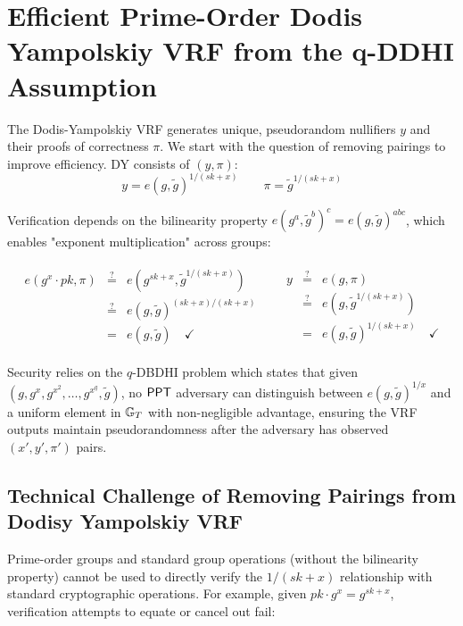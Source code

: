 \section{Efficient Prime-Order Dodis Yampolskiy VRF from the q-DDHI Assumption}\label{sec:vrf-prime-order}

The Dodis-Yampolskiy \cite{hutchison_verifiable_2005} VRF generates unique, pseudorandom nullifiers $y$ and their proofs of correctness $\pi$. We start with the question of removing pairings to improve efficiency. DY consists of $(y, \pi)$:
\[
y = e(g, \tilde{g})^{1/(sk+x)} \qquad \pi = \tilde{g}^{1/(sk+x)}
\]

Verification depends on the bilinearity property $e(g^a, \tilde{g}^b)^c = e(g, \tilde{g})^{abc}$, which enables "exponent multiplication" across groups:

\begin{align*}
    \begin{array}{rcl}
    e(g^x \cdot pk, \pi) & \stackrel{?}{=} & e(g^{sk+x}, \tilde{g}^{1/(sk+x)}) \\
     & \stackrel{?}{=} & e(g, \tilde{g})^{(sk+x)/(sk+x)} \\
     & = & e(g, \tilde{g}) \quad \checkmark
    \end{array}
    &&
    \begin{array}{rcl}
    y & \stackrel{?}{=} & e(g, \pi) \\
     & \stackrel{?}{=} & e(g,\tilde{g}^{1/(sk+x)}) \\
     & = & e(g, \tilde{g})^{1/(sk+x)} \quad \checkmark
    \end{array}
\end{align*}

Security relies on the $q$-DBDHI problem which states that given $(g, g^x, g^{x^2}, \ldots, g^{x^q}, \tilde{g})$, no $\mathsf{PPT}$ adversary can distinguish between $e(g,\tilde{g})^{1/x}$ and a uniform element in $\mathbb{G}_T$ with non-negligible advantage, ensuring the VRF outputs maintain pseudorandomness after the adversary has observed $(x',y',\pi')$ pairs.

\subsection{Technical Challenge of Removing Pairings from Dodisy Yampolskiy VRF}

Prime-order groups and standard group operations (without the bilinearity property) cannot be used to directly verify the $1/(sk+x)$ relationship with standard cryptographic operations. For example, given $pk  \cdot g^x = g^{sk+x}$, verification attempts to equate or cancel out fail:

